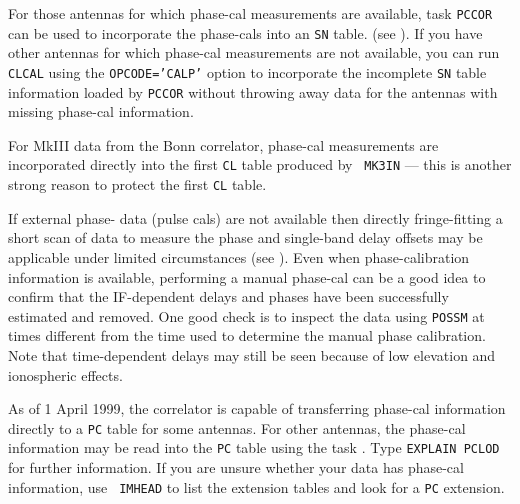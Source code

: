 For those antennas for which phase-cal measurements are available,
task {\tt PCCOR} can be used to incorporate the phase-cals into an
{\tt SN} table. (see ).  If you have other antennas for
which phase-cal measurements are not available, you can run {\tt
CLCAL} using the {\tt OPCODE='CALP'} option to incorporate the
incomplete {\tt SN} table information loaded by {\tt PCCOR} without
throwing away data for the antennas with missing phase-cal
information.

For MkIII data from the Bonn correlator, phase-cal measurements are
incorporated directly into the first {\tt CL} table produced by {\tt
MK3IN} --- this is another strong reason to protect the first {\tt CL}
table.

If external phase- data (pulse cals) are not
available then directly fringe-fitting a short scan of data to measure
the phase and single-band delay offsets may be applicable under
limited circumstances (see ).  Even when
phase-calibration information is available, performing a manual
phase-cal can be a good idea to confirm that the IF-dependent delays
and phases have been successfully estimated and removed.  One good
check is to inspect the data using {\tt POSSM} at times different from
the time used to determine the manual phase calibration.  Note that
time-dependent delays may still be seen because of low elevation and
ionospheric effects.

As of 1 April 1999, the  correlator is capable of
transferring phase-cal information directly to a {\tt PC} table for
some antennas. For other antennas, the phase-cal information may be
read into the {\tt PC} table using the task {\tt{}}\@. Type
{\tt EXPLAIN PCLOD} for further information.  If you are unsure
whether your  data has phase-cal information, use {\tt
IMHEAD} to list the extension tables and look for a {\tt PC}
extension.

